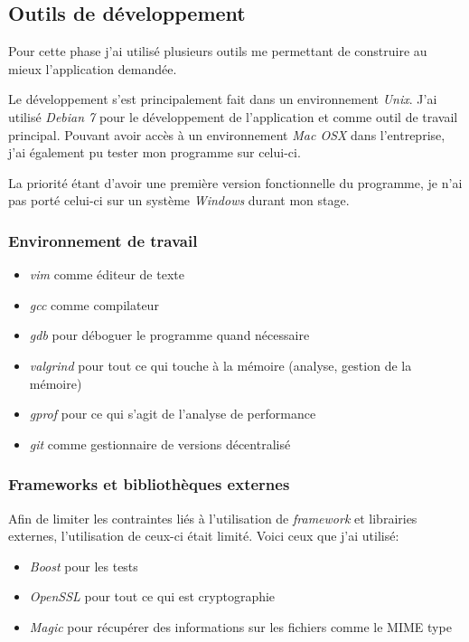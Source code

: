 \documentclass[a4paper,10pt, twoside]{report}
\begin{document}
\begin{spacing}{1.2}
\subsection{Outils de d\'eveloppement}
Pour cette phase j'ai utilis\'e plusieurs outils me permettant de construire
au mieux l'application demand\'ee. 

Le d\'eveloppement s'est principalement fait dans un environnement
\textit{Unix}. J'ai utilis\'e \textit{Debian 7} pour le d\'eveloppement de
l'application et comme outil de travail principal. Pouvant avoir acc\`es \`a un
environnement \textit{Mac OSX} dans l'entreprise, j'ai \'egalement pu tester
mon programme sur celui-ci.

La priorit\'e \'etant d'avoir une premi\`ere version fonctionnelle du
programme, je n'ai pas port\'e celui-ci sur un syst\`eme \textit{Windows}
durant mon stage.

\subsubsection{Environnement de travail}
\begin{itemize}
 \item \textit{vim} comme \'editeur de texte
 \item \textit{gcc} comme compilateur
 \item \textit{gdb} pour d\'eboguer le programme quand n\'ecessaire
 \item \textit{valgrind} pour tout ce qui touche \`a la m\'emoire (analyse,
 gestion de la m\'emoire)
 \item \textit{gprof} pour ce qui s'agit de l'analyse de performance
 \item \textit{git} comme gestionnaire de versions d\'ecentralis\'e
\end{itemize}

\subsubsection{Frameworks et biblioth\`eques externes}
Afin de limiter les contraintes li\'es \`a l'utilisation de \textit{framework}
et librairies externes, l'utilisation de ceux-ci \'etait limit\'e. Voici
ceux que j'ai utilis\'e:
\begin{itemize}
 \item \textit{Boost} pour les tests
 \item \textit{OpenSSL} pour tout ce qui est cryptographie
 \item \textit{Magic} pour r\'ecup\'erer des informations sur les fichiers
 comme le MIME type
\end{itemize}


\end{spacing}
\end{document}
